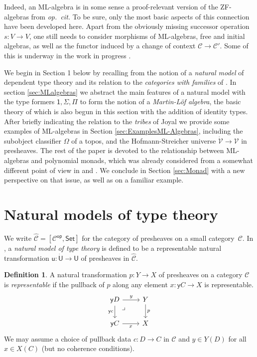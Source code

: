 \documentclass[12pt,reqno]{amsart}
\newcommand{\CC}{\ensuremath{\mathcal{C}}}
\newcommand{\op}[1]{\ensuremath{{#1}^{\mathsf{op}}}}
\newcommand{\psh}[1]{\ensuremath{[\op{#1},\mathsf{Set}]}}
\newcommand{\y}{\ensuremath{\mathsf{y}}} %
\renewcommand{\to}{\ensuremath{\rightarrow}}
\renewcommand{\t}{\ensuremath{\mathsf{u}}}
\newcommand{\T}{\ensuremath{\mathsf{U}}}
\newcommand{\TT}{\ensuremath{\dot{\mathsf{U}}}}
\newcommand{\V}{\ensuremath{\mathcal{V}}}
\newcommand{\VV}{\ensuremath{\dot{\mathcal{V}}}}
\newcommand{\pbcorner}{\arrow[dr,phantom,"\lrcorner" very near start, shift right=.5ex]} %
\theoremstyle{remark}
\theoremstyle{definition}
\newtheorem{definition}[theorem]{Definition}
\begin{document}
Indeed, an ML-algebra is in some sense a proof-relevant version of the ZF-algebras from \emph{op.\ cit.}  To be sure, only the most basic aspects of this connection have been developed here.   Apart from the obviously missing successor operation $s : V\to V$, one still needs to consider morphisms of ML-algebras, free and initial algebras, as well as the functor induced by a change of context $\CC \to \CC'$. Some of this is underway in the work in progress \cite{Fernando}.
\medskip

We begin in Section 1 below by recalling from \cite{awodey:NM} the notion of a \emph{natural model} of dependent type theory and its relation to the \emph{categories with families} of \cite{Dybjer:CWF}.  In section \ref{sec:MLalgebras} we abstract the main features of a natural model with the type formers $\mathsf{1}, \Sigma, \Pi$ to form the notion of a \emph{Martin-L\"of algebra}, the basic theory of which is also begun in this section with the addition of identity types.   After briefly indicating the relation to the \emph{tribes} of Joyal \cite{Joyal:CandT} we provide some examples of ML-algebras in Section \ref{sec:ExamplesML-Algebras}, including the subobject classifier $\Omega$ of a topos, and the Hofmann-Streicher universe $\VV\to\V$ in presheaves.  The rest of the paper is devoted to the relationship between ML-algebras and polynomial monads, which was already considered from a somewhat different point of view in \cite{ Newstead:thesis} and \cite{NA:2018}.  We conclude in Section \ref{sec:Monad} with a new perspective on that issue, as well as on a familiar example. 

\section{Natural models of type theory}\label{sec:NaturalModels}

\noindent We write $\widehat{\CC} = \psh{\CC}$ for the category of presheaves on a small category~$\CC$. 
In \cite{awodey:NM}, a \emph{natural model of type theory} is defined to be a representable natural transformation $\t: \TT\to \T$ of presheaves in $\widehat{\CC}$.  

\begin{definition}\label{def:representablenattrans} A natural transformation $p : Y \to X$ of presheaves on a category $\CC$  is \emph{representable} if the pullback of $p$ along any element $x: \y{C} \to X$ is representable.
\begin{equation*}
\begin{tikzcd}
 \y{D} \ar[d,swap,"{\y{c}}"] \ar[r,"y"] \pbcorner &  Y \ar[d, "p"]\\
\y{C} \ar[r,swap,"x"]  & X
\end{tikzcd}
\end{equation*}
We may assume a choice of pullback data $c : D \to C$ in $\CC$ and $y \in Y(D)$ for all $x\in X(C)$ (but no coherence conditions).
\end{definition}
\end{document}
